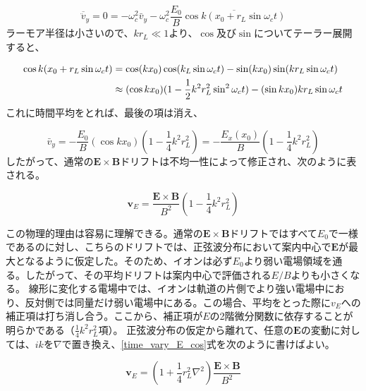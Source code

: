 \documentclass{ltjsarticle}
\numberwithin{equation}{section} %
\begin{document}
\begin{equation}
  \overline{\ddot{v}}_y = 0 = -\omega_c ^2 \bar{v}_y - \omega_c^2\frac{E_0}{B}\overline{\cos k(x_0 + r_L \sin \omega_c t)}
\end{equation}
ラーモア半径は小さいので、$kr_L \ll 1$より、$\cos$及び$\sin$についてテーラー展開すると、

\begin{align}
  \cos k(x_0 +r_L \sin \omega_c t) &= \cos (kx_0) \cos (k_L \sin \omega_c t) - \sin (kx_0) \sin (kr_L \sin \omega_c t) \notag \\ 
                                   &\approx (\cos kx_0)(1-\frac{1}{2} k^2 r_L^2 \sin^2 \omega_c t) - (\sin kx_0)kr_L \sin \omega_c t
\end{align}
これに時間平均をとれば、最後の項は消え、

\begin{equation}
  \bar{v}_y = -\frac{E_0}{B}(\cos kx_0)\left(1-\frac{1}{4}k^2r_L ^2\right) = -\frac{E_x(x_0)}{B}\left(1-\frac{1}{4}k^2 r_L ^2\right)
\end{equation}
 したがって、通常の$\bm{E} \times \bm{B}$ドリフトは不均一性によって修正され、次のように表される。

 \begin{equation}
  \bm{v}_E = \frac{\bm{E} \times \bm{B}}{B^2}\left(1-\frac{1}{4}k^2r_L^2\right) \label{time_vary_E_cos}
 \end{equation}

 この物理的理由は容易に理解できる。通常の$\bm{E}\times \bm{B}$ドリフトではすべて$E_0$で一様であるのに対し、こちらのドリフトでは、正弦波分布において案内中心で$\bm{E}$が最大となるように仮定した。そのため、イオンは必ず$E_0$より弱い電場領域を通る。したがって、その平均ドリフトは案内中心で評価される$E/B$よりも小さくなる。
 線形に変化する電場中では、イオンは軌道の片側でより強い電場中におり、反対側では同量だけ弱い電場中にある。この場合、平均をとった際に$v_E$への補正項は打ち消し合う。ここから、補正項が$E$の2階微分関数に依存することが明らかである（$\frac{1}{4}k^2r_L^2$項）。
正弦波分布の仮定から離れて、任意の$\bm{E}$の変動に対しては、$ik$を$\nabla$で置き換え、\eqref{time_vary_E_cos}式を次のように書けばよい。

\begin{equation}
  \bm{v}_E = \left(1+\frac{1}{4}r_L^2\nabla^2\right)\frac{\bm{E}\times \bm{B}}{B^2} \label{time_vary_general}
\end{equation}
\end{document}
